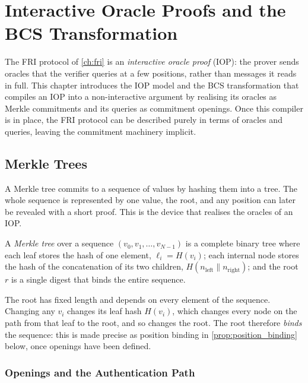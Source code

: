 \chapter{Interactive Oracle Proofs and the BCS Transformation}
\label{ch:iop}

The FRI protocol of \cref{ch:fri} is an
\emph{interactive oracle proof} (IOP): the prover sends oracles that the
verifier queries at a few positions, rather than messages it reads in
full. This chapter introduces the IOP model and the BCS transformation
that compiles an IOP into a non-interactive argument by realising its
oracles as Merkle commitments and its queries as commitment openings.
Once this compiler is in place, the FRI protocol can be described purely
in terms of oracles and queries, leaving the commitment machinery
implicit.

\section{Merkle Trees}
\label{sec:merkle_trees}
A Merkle tree commits to a sequence of values by hashing them into a
tree. The whole sequence is represented by one value, the root, and any
position can later be revealed with a short proof. This is the device
that realises the oracles of an IOP.

\begin{definition}
\label{def:merkle}
A \emph{Merkle tree} over a sequence $(v_0, v_1, \ldots, v_{N-1})$
is a complete binary tree where each leaf stores the hash of one
element, $\ell_i = H(v_i)$; each internal node stores the hash of the
concatenation of its two children,
$H(n_{\mathrm{left}} \| n_{\mathrm{right}})$; and the root $r$ is a
single digest that binds the entire sequence.
\end{definition}

The root has fixed length and depends on every element of the sequence.
Changing any $v_i$ changes its leaf hash $H(v_i)$, which changes every
node on the path from that leaf to the root, and so changes the root.
The root therefore \emph{binds} the sequence: this is made precise as
position binding in \cref{prop:position_binding} below, once openings
have been defined.



\subsection{Openings and the Authentication Path}
\label{subsec:merkle_opening}
 
